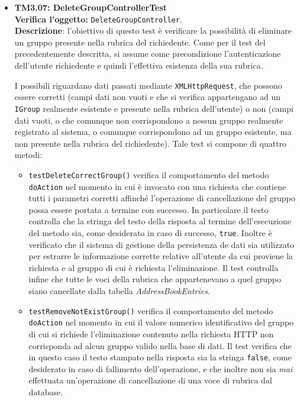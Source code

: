 \begin{itemize}
\item \textbf{TM3.07: DeleteGroupControllerTest}\\
\textbf{Verifica l'oggetto:} \texttt{DeleteGroupController}.\\
\textbf{Descrizione}: l'obiettivo di questo test è verificare la possibilità di eliminare un gruppo presente nella rubrica del richiedente. Come per il test del  precedentemente descritta, si assume come precondizione l'autenticazione dell'utente richiedente e quindi l'effettiva esistenza della sua rubrica.

I possibili  riguardano dati passati mediante \texttt{XMLHttpRequest}, che possono essere corretti (campi dati non vuoti e che si verifica appartengano ad un \texttt{IGroup} realmente esistente e presente nella rubrica dell'utente) o non (campi dati vuoti, o che comunque non corrispondono a nessun gruppo realmente registrato al sistema, o comunque corrispondono ad un gruppo esistente, ma non presente nella rubrica del richiedente). %
Tale test si compone di quattro metodi:

\begin{itemize}

\item \texttt{testDeleteCorrectGroup()} verifica il comportamento del metodo \texttt{doAction} nel momento in cui è invocato con una richiesta che contiene tutti i parametri corretti affinché l'operazione di cancellazione del gruppo possa essere portata a termine con successo. In particolare il testo controlla che la stringa del testo della risposta al termine dell'esecuzione del metodo sia, come desiderato in caso di successo, \texttt{true}. Inoltre è verificato che il sistema di gestione della persistenza de dati sia utilizzato per estrarre le informazione corrette relative all'utente da cui proviene la richiesta e al gruppo di cui è richiesta l'eliminazione. Il test controlla infine che tutte le voci della rubrica che appartenevano a quel gruppo siano cancellate dalla tabella \textit{AddressBookEntries}. 

\item \texttt{testRemoveNotExistGroup()} verifica il comportamento del metodo \texttt{doAction} nel momento in cui il valore numerico identificativo del gruppo di cui si richiede l'eliminazione contenuto nella richiesta HTTP non corrisponda ad alcun gruppo valido nella base di dati. Il test verifica che in questo caso il testo stampato nella risposta sia la stringa \texttt{false}, come desiderato in caso di fallimento dell'operazione, e che inoltre non sia \textit{mai} effettuata un'operazione di cancellazione di una voce di rubrica dal database.


\end{itemize}
\end{itemize}
